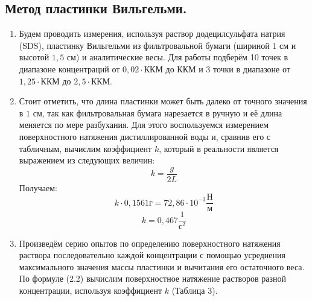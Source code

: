 \documentclass[a4paper, 11pt]{article}%
\begin{document}
\subsection{Метод пластинки Вильгельми.}
\begin{enumerate}
    \item Будем проводить измерения, используя раствор додецилсульфата натрия (SDS), пластинку Вильгельми из фильтровальной бумаги (шириной $1$ см и высотой $1,5$ см) и аналитические весы. Для работы подберём 10 точек в диапазоне концентраций от $0,02 \cdot \text{ККМ}$ до ККМ и 3 точки в диапазоне от $1,25 \cdot \text{ККМ}$ до $2,5 \cdot \text{ККМ}$.

    \item Стоит отметить, что длина пластинки может быть далеко от точного значения в $1$ см, так как фильтровальная бумага нарезается в ручную и её длина меняется по мере разбухания. Для этого воспользуемся измерением поверхностного натяжения дистиллированной воды и, сравнив его с табличным, вычислим коэффициент $k$, который в реальности является выражением из следующих величин:
    $$k = \frac{g}{2L}$$
    Получаем:
    $$k \cdot 0,1561 \text{г} = 72,86 \cdot 10^{-3} \frac{\text{H}}{\text{м}}$$
    $$k = 0,467 \frac{1}{\text{с}^2}$$

    \item Произведём серию опытов по определению поверхностного натяжения раствора последовательно каждой концентрации с помощью усреднения максимального значения массы пластинки и вычитания его остаточного веса. По формуле (2.2) вычислим поверхностное натяжение растворов разной концентрации, используя коэффициент $k$ (Таблица 3).


\end{enumerate}
\end{document}

